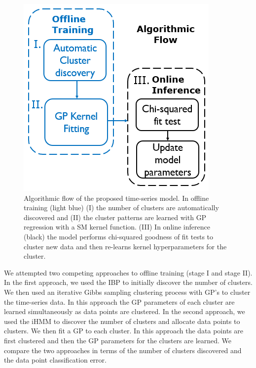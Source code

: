 \documentclass{article}
\begin{document}
\begin{figure}[ht]
\vskip 0.2in
\begin{center}
\centerline{\includegraphics[width=\columnwidth]{AlgFlow2}}
\caption{Algorithmic flow of the proposed time-series model. In offline training (light blue) (I) the number of clusters are automatically discovered and (II) the cluster patterns are learned with GP regression with a SM kernel function. (III) In online inference (black) the model performs chi-squared goodness of fit tests to cluster new data and then re-learns kernel hyperparameters for the cluster.}
\label{AlgFlow2}
\end{center}
\vskip -0.2in
\end{figure} 

We attempted two competing approaches to offline training (stage I and stage II). In the first approach, we used the IBP to initially discover the number of clusters. We then used an iterative Gibbs sampling clustering process with GP's to cluster the time-series data. In this approach the GP parameters of each cluster are learned simultaneously as data points are clustered. In the second approach, we used the iHMM to discover the number of clusters and allocate data points to clusters. We then fit a GP to each cluster. In this approach the data points are first clustered and then the GP parameters for the clusters are learned. We compare the two approaches in terms of the number of clusters discovered and the data point classification error.
\end{document}
